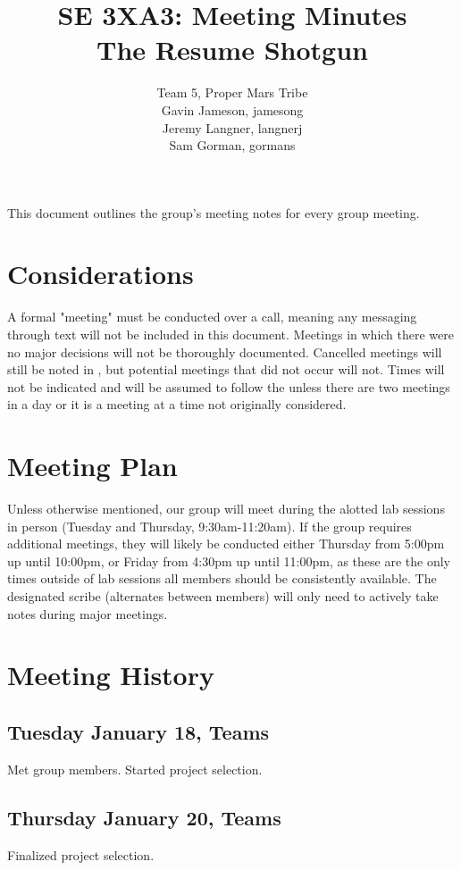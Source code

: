 \documentclass{article}
\title{SE 3XA3: Meeting Minutes\\The Resume Shotgun}
\author{Team 5, Proper Mars Tribe
		\\ Gavin Jameson, jamesong
		\\ Jeremy Langner, langnerj
		\\ Sam Gorman, gormans
}
\date{}
\begin{document}
\maketitle

\newpage

\tableofcontents

\newpage

This document outlines the group's meeting notes for every group meeting. 

\section{Considerations} \label{sec:considerations}
A formal "meeting" must be conducted over a call, meaning any messaging through text will not be included in this document. Meetings in which there were no major decisions will not be thoroughly documented. Cancelled meetings will still be noted in , but potential meetings that did not occur will not. Times will not be indicated and will be assumed to follow the  unless there are two meetings in a day or it is a meeting at a time not originally considered.

\section{Meeting Plan} \label{sec:plam}
Unless otherwise mentioned, our group will meet during the alotted lab sessions in person (Tuesday and Thursday, 9:30am-11:20am). If the group requires additional meetings, they will likely be conducted either Thursday from 5:00pm up until 10:00pm, or Friday from 4:30pm up until 11:00pm, as these are the only times outside of lab sessions all members should be consistently available. The designated scribe (alternates between members) will only need to actively take notes during major meetings.

\section{Meeting History} \label{sec:history}

\subsection{Tuesday January 18, Teams}
Met group members. Started project selection.

\subsection{Thursday January 20, Teams}
Finalized project selection.
\end{document}
